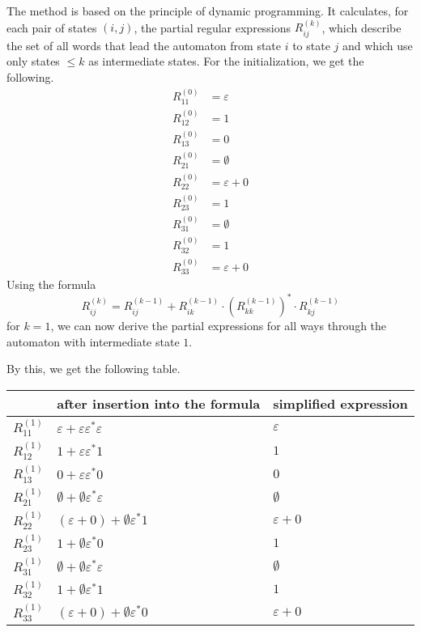 \documentclass{exercise}
\begin{document}
  \newpage
  \begin{solution}
    The method is based on the principle of dynamic programming.  It
    calculates, for each pair of states $(i,j)$, the partial regular
    expressions $R_{ij}^{(k)}$, which describe the set of all words that lead
    the automaton from state $i$ to state $j$ and which use only states $\leq
    k$ as intermediate states.  For the initialization, we get the following.
    \begin{align*}
      R_{11}^{(0)} &= \varepsilon   \\
      R_{12}^{(0)} &= 1             \\
      R_{13}^{(0)} &= 0             \\
      R_{21}^{(0)} &= \emptyset     \\
      R_{22}^{(0)} &= \varepsilon+0 \\
      R_{23}^{(0)} &= 1             \\
      R_{31}^{(0)} &= \emptyset     \\
      R_{32}^{(0)} &= 1             \\
      R_{33}^{(0)} &= \varepsilon+0
    \end{align*}
    Using the formula
    \[ R_{ij}^{(k)} = R_{ij}^{(k-1)} + R_{ik}^{(k-1)} \cdot \left(R_{kk}^{(k-1)}\right)^* \cdot R_{kj}^{(k-1)} \]
    for $k = 1$, we can now derive the partial expressions for all ways through
    the automaton with intermediate state $1$.
   
    By this, we get the following table.
    \begin{center}
      \begin{tabular}{l|l|l}
        & after insertion into the formula & simplified expression\\
        \hline
        $R_{11}^{(1)}$ & $\varepsilon + \varepsilon\varepsilon^*\varepsilon$ & $\varepsilon$     \\
        $R_{12}^{(1)}$ & $1 + \varepsilon\varepsilon^*1$                     & $1$               \\
        $R_{13}^{(1)}$ & $0 + \varepsilon\varepsilon^*0$                     & $0$               \\
        $R_{21}^{(1)}$ & $\emptyset + \emptyset\varepsilon^*\varepsilon$     & $\emptyset$       \\
        $R_{22}^{(1)}$ & $(\varepsilon+0)+\emptyset\varepsilon^*1$           & $\varepsilon + 0$ \\
        $R_{23}^{(1)}$ & $1+\emptyset\varepsilon^*0$                         & $1$               \\
        $R_{31}^{(1)}$ & $\emptyset+\emptyset\varepsilon^*\varepsilon$       & $\emptyset$       \\
        $R_{32}^{(1)}$ & $1 + \emptyset\varepsilon^*1$                       & $1$               \\
        $R_{33}^{(1)}$ & $(\varepsilon+0)+\emptyset\varepsilon^*0$           & $\varepsilon+0$
      \end{tabular}
    \end{center}
  

\end{solution}
\end{document}
